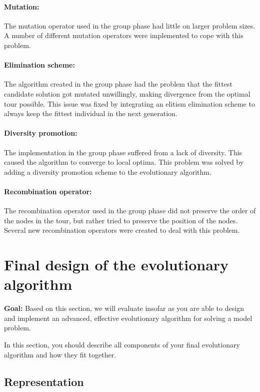 \documentclass[a4paper,10pt]{article}
\newcommand{\ReplaceMe}[1]{{\color{blue}#1}}
\newcommand{\RemoveMe}[1]{{\color{purple}#1}}
\begin{document}
\paragraph{Mutation:} The mutation operator used in the group phase had little on larger problem sizes. A number of different mutation operators were implemented to cope with this problem.

\paragraph{Elimination scheme:} The algorithm created in the group phase had the problem that the fittest candidate solution got mutated unwillingly, making divergence from the optimal tour possible. This issue was fixed by integrating an elitism elimination scheme to always keep the fittest individual in the next generation.

\paragraph{Diversity promotion:} The implementation in the group phase suffered from a lack of diversity. This caused the algorithm to converge to local optima. This problem was solved by adding a diversity promotion scheme to the evolutionary algorithm.

\paragraph{Recombination operator:} The recombination operator used in the group phase did not preserve the order of the nodes in the tour, but rather tried to preserve the position of the nodes. Several new recombination operators were created to deal with this problem.

\section{Final design of the evolutionary algorithm} 

\RemoveMe{\textbf{Goal:} Based on this section, we will evaluate insofar as you are able to design and implement an advanced, effective evolutionary algorithm for solving a model problem.}

\ReplaceMe{In this section, you should describe all components of your final evolutionary algorithm and how they fit together.}

\subsection{Representation}
\end{document}
